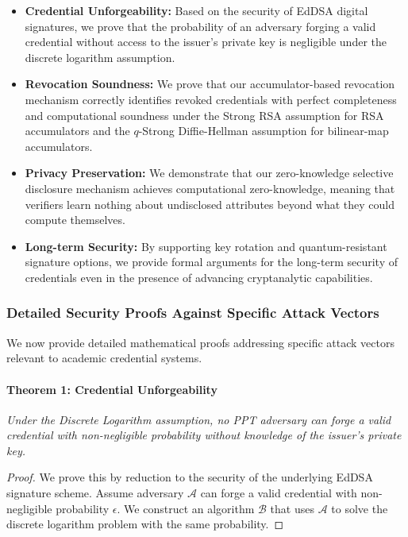 \documentclass[lettersize,journal]{IEEEtran}
\begin{document}
\begin{itemize}
\begin{itemize}
    \item \textbf{Credential Unforgeability:} Based on the security of EdDSA digital signatures, we prove that the probability of an adversary forging a valid credential without access to the issuer's private key is negligible under the discrete logarithm assumption.
    
    \item \textbf{Revocation Soundness:} We prove that our accumulator-based revocation mechanism correctly identifies revoked credentials with perfect completeness and computational soundness under the Strong RSA assumption for RSA accumulators and the $q$-Strong Diffie-Hellman assumption for bilinear-map accumulators.
    
    \item \textbf{Privacy Preservation:} We demonstrate that our zero-knowledge selective disclosure mechanism achieves computational zero-knowledge, meaning that verifiers learn nothing about undisclosed attributes beyond what they could compute themselves.
    
    \item \textbf{Long-term Security:} By supporting key rotation and quantum-resistant signature options, we provide formal arguments for the long-term security of credentials even in the presence of advancing cryptanalytic capabilities.
\end{itemize}

\subsubsection{Detailed Security Proofs Against Specific Attack Vectors}
We now provide detailed mathematical proofs addressing specific attack vectors relevant to academic credential systems.

\paragraph{Theorem 1: Credential Unforgeability}
\textit{Under the Discrete Logarithm assumption, no PPT adversary can forge a valid credential with non-negligible probability without knowledge of the issuer's private key.}

\begin{proof}
We prove this by reduction to the security of the underlying EdDSA signature scheme. Assume adversary $\mathcal{A}$ can forge a valid credential with non-negligible probability $\epsilon$. We construct an algorithm $\mathcal{B}$ that uses $\mathcal{A}$ to solve the discrete logarithm problem with the same probability.


\end{proof}
\end{itemize}
\end{document}
